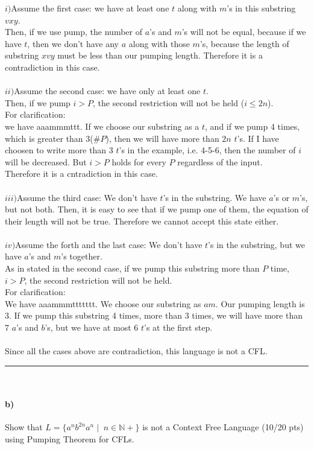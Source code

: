 \documentclass[a4paper,12pt]{article}
\newcommand{\HRule}{\rule{\linewidth}{1mm}}
\begin{document}
$i)$Assume the first case: we have at least one $t$ along with $m$'s in this substring $vxy$.\\
Then, if we use pump, the number of $a$'s and $m$'s will not be equal, because if we have $t$, then we don't have any $a$ along with those $m$'s, because the length of substring $xvy$ must be less than our pumping length. Therefore it is a contradiction in this case.\\\\
$ii)$Assume the second case: we have only at least one $t$.\\
Then, if we pump $i > P$, the second restriction will not be held ($i \leq 2n$).\\
For clarification:\\
we have aaammmttt. If we choose our substring as a $t$, and if we pump 4 times, which is greater than 3($\#P$), then we will have more than $2n$ $t$'s. If I have choosen to write more than 3 $t$'s in the example, i.e. 4-5-6, then the number of $i$ will be decreased. But $i > P$ holds for every $P$ regardless of the input.\\
Therefore it is a cntradiction in this case.\\\\
$iii)$Assume the third case: We don't have $t$'s in the substring. We have $a$'s or $m$'s, but not both. Then, it is easy to see that if we pump one of them, the equation of their length will not be true. Therefore we cannot accept this state either.\\\\
$iv)$Assume the forth and the last case: We don't have $t$'s in the substring, but we have $a$'s and $m$'s together.\\
As in stated in the second case, if we pump this substring more than $P$ time, $i > P$, the second restriction will not be held.\\
For clarification:\\
We have aaammmttttttt. We choose our substring as $am$. Our pumping length is 3. If we pump this substring 4 times, more than 3 times, we will have more than 7 $a$'s and $b$'s, but we have at most 6 $t$'s at the first step.\\\\
Since all the cases above are contradiction, this language is not a CFL.\\
\HRule\\


\paragraph{b)} Show that $L=\{a^n b^{2n} a^n \mid \; n \in \mathbb{N+} \}$ is not a Context Free Language \hfill \small{(10/20 pts)} \\
using Pumping Theorem for CFLs. \\
\end{document}
